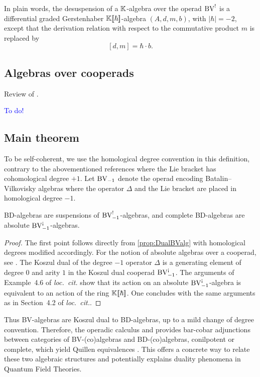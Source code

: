 In plain words, the desuspension of a \(\mathbb{K}\)-algebra over the operad \(\mathrm{BV}^!\) is a differential graded Gerstenhaber \(\mathbb{K}[\![\hbar]\!]\)-algebra \((A, d, m, b %
)\), with \(|\hbar|=-2\), except that the derivation relation with respect to the commutative product \(m\) is replaced by
\[
[d, m] = \hbar \cdot b. %
\]

\subsection{Algebras over cooperads}

Review of \cite{rocailucio2025absolute}.

\textcolor{blue}{To do!}

\subsection{Main theorem}

To be self-coherent, we use the homological degree convention in this definition, contrary to the abovementioned references where the Lie bracket has cohomological degree \(+1\).
Let \(\mathrm{BV}_{-1}\) denote the operad encoding Batalin--Vilkovisky algebras where the operator \(\Delta\) and the Lie bracket are placed in homological degree \(-1\).

\begin{theorem}
	BD-algebras are suspensions of \(\mathrm{BV}_{-1}^!\)-algebras, and complete BD-algebras are absolute \(\mathrm{BV}_{-1}^{{\scriptstyle \text{\rm !`}}}\)-algebras.
\end{theorem}

\begin{proof}
	The first point follows directly from \cref{prop:DualBValg} with homological degrees modified accordingly.
	For the notion of absolute algebras over a cooperad, see \cite[Section~3]{rocailucio2025absolute}.
	The Koszul dual of the degree \(-1\) operator \(\Delta\) is a generating element of degree \(0\) and arity \(1\) in the Koszul dual cooperad \(\mathrm{BV}_{-1}^{{\scriptstyle \text{\rm !`}}}\).
	The arguments of Example~4.6 of \emph{loc.\ cit.} show that its action on an absolute \(\mathrm{BV}_{-1}^{{\scriptstyle \text{\rm !`}}}\)-algebra is equivalent to an action of the ring \(\mathbb{K}[\![\hbar]\!]\).
	One concludes with the same arguments as in Section~4.2 of \emph{loc.\ cit.}.
\end{proof}

Thus BV-algebras are Koszul dual to BD-algebras, up to a mild change of degree convention.
Therefore, the operadic calculus \cite[Chapter~11]{LodayVallette12} and \cite{rocailucio2025absolute} provides bar-cobar adjunctions between categories of BV-(co)algebras and BD-(co)algebras, conilpotent or complete, which yield Quillen equivalences \cite{Vallette14}.
This offers a concrete way to relate these two algebraic structures and potentially explains duality phenomena in Quantum Field Theories.